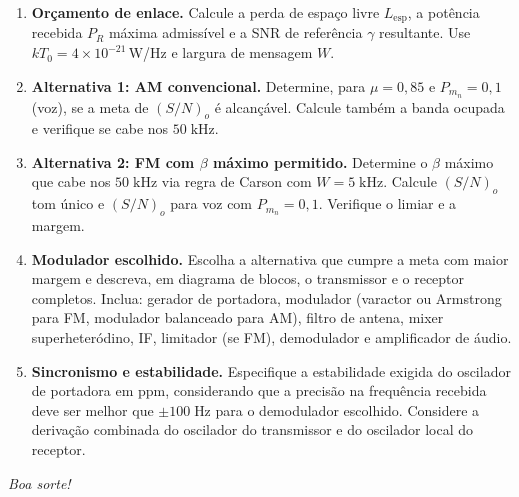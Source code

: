 \documentclass[11pt,a4paper]{article}
\begin{document}
\begin{enumerate}[label=\alph*)]
  \item \textbf{Orçamento de enlace.} Calcule a perda de espaço livre $L_{\text{esp}}$, a potência recebida $P_R$ máxima admissível e a SNR de referência $\gamma$ resultante. Use $kT_0 = 4\times 10^{-21}$\,W/Hz e largura de mensagem $W$.
  \item \textbf{Alternativa 1: AM convencional.} Determine, para $\mu = 0{,}85$ e $P_{m_n} = 0{,}1$ (voz), se a meta de $(S/N)_o$ é alcançável. Calcule também a banda ocupada e verifique se cabe nos $50\;\text{kHz}$.
  \item \textbf{Alternativa 2: FM com $\beta$ máximo permitido.} Determine o $\beta$ máximo que cabe nos $50\;\text{kHz}$ via regra de Carson com $W = 5\;\text{kHz}$. Calcule $(S/N)_o$ tom único e $(S/N)_o$ para voz com $P_{m_n} = 0{,}1$. Verifique o limiar e a margem.
  \item \textbf{Modulador escolhido.} Escolha a alternativa que cumpre a meta com maior margem e descreva, em diagrama de blocos, o transmissor e o receptor completos. Inclua: gerador de portadora, modulador (varactor ou Armstrong para FM, modulador balanceado para AM), filtro de antena, mixer superheteródino, IF, limitador (se FM), demodulador e amplificador de áudio.
  \item \textbf{Sincronismo e estabilidade.} Especifique a estabilidade exigida do oscilador de portadora em $\text{ppm}$, considerando que a precisão na frequência recebida deve ser melhor que $\pm 100\;\text{Hz}$ para o demodulador escolhido. Considere a derivação combinada do oscilador do transmissor e do oscilador local do receptor.
\end{enumerate}

\vfill
\begin{center}
  \small\textit{Boa sorte!}
\end{center}
\end{document}
